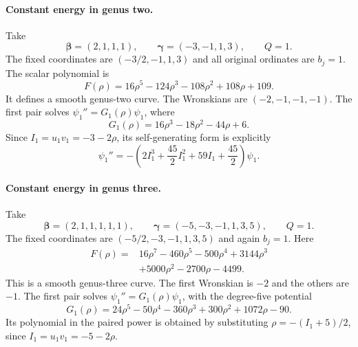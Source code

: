 \documentclass[11pt]{article}
\begin{document}
\paragraph{Constant energy in genus two.}

Take
\begin{equation}
 \boldsymbol\beta=(2,1,1,1),\qquad
 \boldsymbol\gamma=(-3,-1,1,3),\qquad Q=1.
\end{equation}
The fixed coordinates are $(-3/2,-1,1,3)$ and all original ordinates are
$b_j=1$. The scalar polynomial is
\begin{equation}\label{eq:g2-F}
 F(\rho)=16\rho^5-124\rho^3-108\rho^2+108\rho+109.
\end{equation}
It defines a smooth genus-two curve. The Wronskians are $(-2,-1,-1,-1)$.
The first pair solves $\psi_1''=G_1(\rho)\psi_1$, where
\begin{equation}\label{eq:g2-potential}
 G_1(\rho)=16\rho^3-18\rho^2-44\rho+6.
\end{equation}
Since $I_1=u_1v_1=-3-2\rho$, its self-generating form is explicitly
\begin{equation}\label{eq:special-g2-self}
 \psi_1''=-\left(2I_1^3+\frac{45}{2}I_1^2+59I_1+\frac{45}{2}\right)\psi_1.
\end{equation}

\paragraph{Constant energy in genus three.}

Take
\begin{equation}
 \boldsymbol\beta=(2,1,1,1,1,1),\qquad
 \boldsymbol\gamma=(-5,-3,-1,1,3,5),\qquad Q=1.
\end{equation}
The fixed coordinates are $(-5/2,-3,-1,1,3,5)$ and again $b_j=1$.
Here
\begin{equation}\label{eq:g3-F}
 \begin{aligned}
 F(\rho)={}&16\rho^7-460\rho^5-500\rho^4+3144\rho^3\\
          &+5000\rho^2-2700\rho-4499.
 \end{aligned}
\end{equation}
This is a smooth genus-three curve. The first Wronskian is $-2$ and the
others are $-1$. The first pair solves $\psi_1''=G_1(\rho)\psi_1$, with
the degree-five potential
\begin{equation}\label{eq:special-g3-potential}
 G_1(\rho)=24\rho^5-50\rho^4-360\rho^3+300\rho^2+1072\rho-90.
\end{equation}
Its polynomial in the paired power is obtained by substituting
$\rho=-(I_1+5)/2$, since $I_1=u_1v_1=-5-2\rho$.
\end{document}
